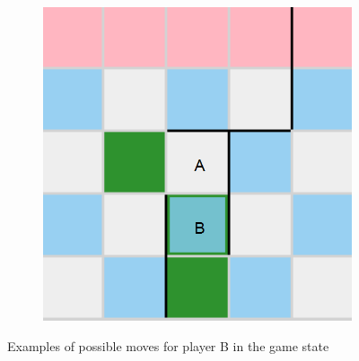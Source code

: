 \begin{figure}[h]
\begin{subfigure}{0.3\textwidth}
    \end{subfigure}
    \hfill
    \begin{subfigure}{0.3\textwidth}
        \includegraphics[width=\textwidth]{../img/GameBoard/move03.png}
    \end{subfigure}
    \hfill
    \caption{Examples of possible moves for player B in the game state}
    \label{fig:PossibleMoves}
\end{figure}